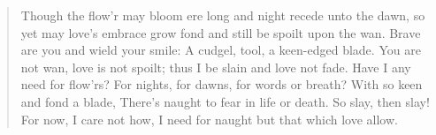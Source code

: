 \begin{verse}
  Though the flow’r may bloom ere long
  \vin and night recede unto the dawn,
  so yet may love’s embrace grow fond
  \vin and still be spoilt upon the wan.
  Brave are you and wield your smile:
  \vin A cudgel, tool, a keen-edged blade.
  You are not wan, love is not spoilt;
  \vin thus I be slain and love not fade.
  Have I any need for flow'rs?
  \vin For nights, for dawns, for words or breath?
  With so keen and fond a blade,
  \vin There's naught to fear in life or death.
  \vin \vin So slay, then slay! For now, I care not how,
  \vin \vin I need for naught but that which love allow.
\end{verse}
